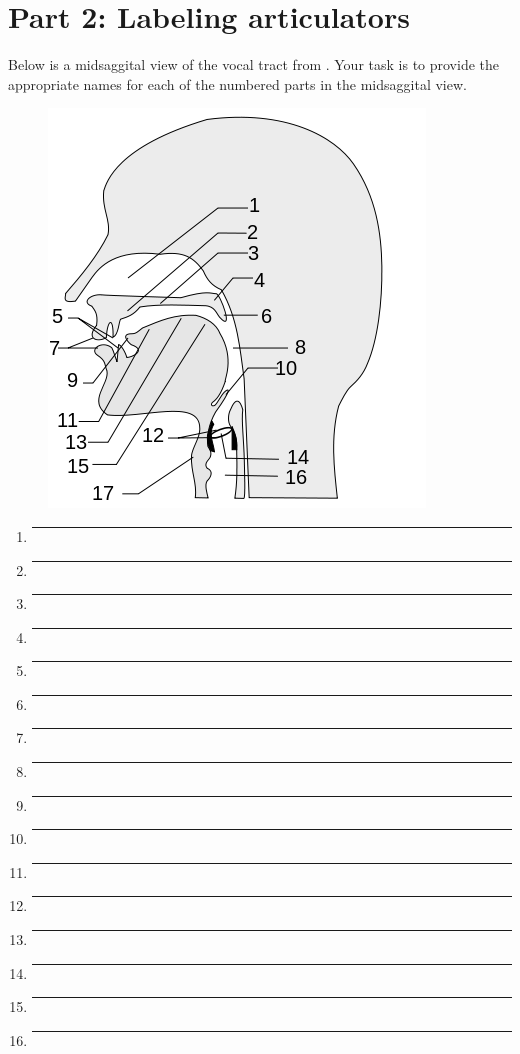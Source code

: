 \documentclass[12pt, letterpaper]{article}
\begin{document}
\section*{Part 2: Labeling articulators} \label{sec:labelingarticulators}

Below is a midsaggital view of the vocal tract from \citet{forinashSoundInteractiveEBook2025}. Your task is to provide the appropriate names for each of the numbered parts in the midsaggital view. 
\begin{figure}[!h]
    \centering
    \includegraphics[width = .75\linewidth]{figs/VocalTract_Labeling.png}
\end{figure}

\begin{multicols}{2}
    \begin{enumerate}
        \setlength{\itemsep}{1em}
        \item \rule{5cm}{0.4pt}
        \item \rule{5cm}{0.4pt}
        \item \rule{5cm}{0.4pt}
        \item \rule{5cm}{0.4pt}
        \item \rule{5cm}{0.4pt}
        \item \rule{5cm}{0.4pt}
        \item \rule{5cm}{0.4pt}
        \item \rule{5cm}{0.4pt}
        \columnbreak
        \item \rule{5cm}{0.4pt}
        \item \rule{5cm}{0.4pt}
        \item \rule{5cm}{0.4pt}
        \item \rule{5cm}{0.4pt}
        \item \rule{5cm}{0.4pt}
        \item \rule{5cm}{0.4pt}
        \item \rule{5cm}{0.4pt}
        \item \rule{5cm}{0.4pt}
    \end{enumerate}
\end{multicols}
\end{document}
